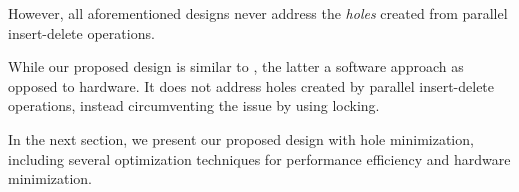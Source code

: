 However, all aforementioned designs never address the {\it holes} created from parallel insert-delete operations.

While our proposed design is similar to \cite{pq6}, the latter a software approach as opposed to hardware. It does not address holes created by parallel insert-delete operations, instead circumventing the issue by using locking.

In the next section, we present our proposed design with hole minimization, including several optimization techniques for performance efficiency and hardware minimization.
